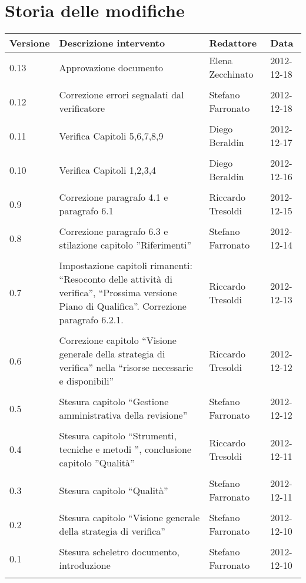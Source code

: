 \section*{Storia delle modifiche}
\begin{tabularx}{\textwidth}{lXll}
\toprule
Versione & Descrizione intervento & Redattore & Data\\
\midrule %
0.13 & Approvazione documento & Elena Zecchinato & 2012-12-18\\\\
0.12 & Correzione errori segnalati dal verificatore & Stefano Farronato & 2012-12-18\\\\
0.11 & Verifica Capitoli 5,6,7,8,9 & Diego Beraldin & 2012-12-17\\\\
0.10 & Verifica Capitoli 1,2,3,4 & Diego Beraldin & 2012-12-16\\\\
0.9 & Correzione paragrafo 4.1 e paragrafo 6.1 & Riccardo Tresoldi & 2012-12-15\\\\
0.8 & Correzione paragrafo 6.3 e stilazione capitolo ''Riferimenti''& Stefano Farronato & 2012-12-14\\\\
0.7 & Impostazione capitoli rimanenti: ``Resoconto delle attività di verifica'', ``Prossima versione Piano di Qualifica''. Correzione paragrafo 6.2.1. & Riccardo Tresoldi & 2012-12-13\\\\
0.6 & Correzione capitolo ``Visione generale della strategia di verifica'' nella ``risorse necessarie e disponibili'' & Riccardo Tresoldi & 2012-12-12\\\\
0.5 & Stesura capitolo ``Gestione amministrativa della revisione''& Stefano Farronato & 2012-12-12\\\\
0.4 & Stesura capitolo ``Strumenti, tecniche e metodi '', conclusione capitolo ''Qualità'' & Riccardo Tresoldi & 2012-12-11\\\\
0.3 & Stesura capitolo ``Qualità'' & Stefano Farronato & 2012-12-11\\\\
0.2 & Stesura capitolo ``Visione generale della strategia di verifica'' & Stefano Farronato & 2012-12-10\\\\
0.1 & Stesura scheletro documento, introduzione & Stefano Farronato & 2012-12-10\\\\
\bottomrule
\end{tabularx}
\newpage

